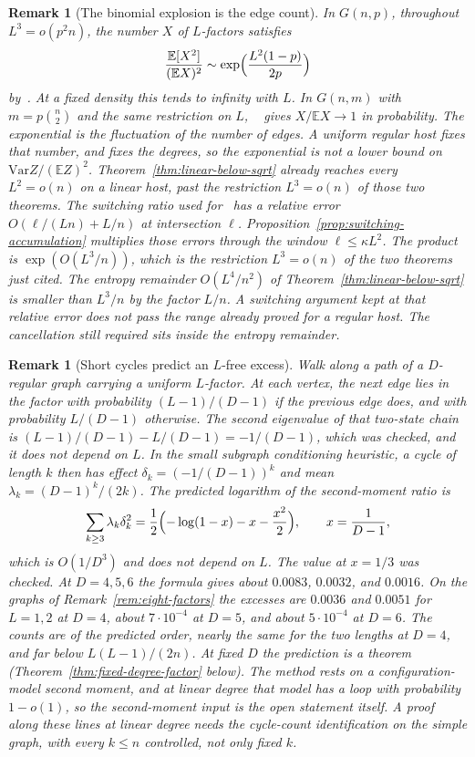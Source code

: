 \documentclass[11pt]{article}
\newtheorem{remark}[theorem]{Remark}
\newcommand{\EE}{\mathbb{E}}
\newcommand{\Var}{\mathrm{Var}}
\begin{document}
\begin{remark}[The binomial explosion is the edge count]
\label{rem:binomial-edge}
In \(G(n,p)\), throughout \(L^3=o(p^2 n)\), the number \(X\) of \(L\)-factors
satisfies
\[
\frac{\EE[X^2]}{(\EE X)^2}
\sim
\exp\Bigl(\frac{L^2(1-p)}{2p}\Bigr)
\]
by~\cite[Theorem~2.1]{Gao13}.
At a fixed density this tends to infinity with \(L\).
In \(G(n,m)\) with \(m=p\binom{n}{2}\) and the same restriction on \(L\),
~\cite[Theorem~2.4]{Gao13} gives \(X/\EE X\to 1\) in probability.
The exponential is the fluctuation of the number of edges.
A uniform regular host fixes that number, and fixes the degrees, so the
exponential is not a lower bound on \(\Var Z/(\EE Z)^2\).
Theorem~\ref{thm:linear-below-sqrt} already reaches every \(L^2=o(n)\) on a
linear host, past the restriction \(L^3=o(n)\) of those two theorems.
The switching ratio used for~\cite[Theorem~2.4]{Gao13} has a relative error
\(O(\ell/(Ln)+L/n)\) at intersection \(\ell\).
Proposition~\ref{prop:switching-accumulation} multiplies those errors through
the window \(\ell\le\kappa L^2\). The product is \(\exp(O(L^3/n))\), which is
the restriction \(L^3=o(n)\) of the two theorems just cited.
The entropy remainder \(O(L^4/n^2)\) of Theorem~\ref{thm:linear-below-sqrt} is
smaller than \(L^3/n\) by the factor \(L/n\).
A switching argument kept at that relative error does not pass the range
already proved for a regular host. The cancellation still required sits inside
the entropy remainder.
\end{remark}

\begin{remark}[Short cycles predict an \(L\)-free excess]
\label{rem:cycle-prediction}
Walk along a path of a \(D\)-regular graph carrying a uniform \(L\)-factor.
At each vertex, the next edge lies in the factor with probability
\((L-1)/(D-1)\) if the previous edge does, and with probability \(L/(D-1)\)
otherwise.
The second eigenvalue of that two-state chain is
\((L-1)/(D-1)-L/(D-1)=-1/(D-1)\), which was checked, and it does not depend
on \(L\).
In the small subgraph conditioning heuristic, a cycle of length \(k\) then
has effect \(\delta_k=(-1/(D-1))^k\) and mean \(\lambda_k=(D-1)^k/(2k)\).
The predicted logarithm of the second-moment ratio is
\[
\sum_{k\ge 3}\lambda_k\delta_k^2
=
\frac12\Bigl(-\log(1-x)-x-\frac{x^2}{2}\Bigr),
\qquad
x=\frac1{D-1},
\]
which is \(O(1/D^3)\) and does not depend on \(L\).
The value at \(x=1/3\) was checked.
At \(D=4,5,6\) the formula gives about \(0.0083\), \(0.0032\), and
\(0.0016\). On the graphs of Remark~\ref{rem:eight-factors} the excesses are
\(0.0036\) and \(0.0051\) for \(L=1,2\) at \(D=4\), about \(7\cdot 10^{-4}\) at
\(D=5\), and about \(5\cdot 10^{-4}\) at \(D=6\).
The counts are of the predicted order, nearly the same for the two lengths
at \(D=4\), and far below \(L(L-1)/(2n)\).
At fixed \(D\) the prediction is a theorem
(Theorem~\ref{thm:fixed-degree-factor} below).
The method rests on a configuration-model second moment, and at linear degree
that model has a loop with probability \(1-o(1)\), so the second-moment input
is the open statement itself.
A proof along these lines at linear degree needs the cycle-count
identification on the simple graph, with every \(k\le n\) controlled, not only
fixed \(k\).
\end{remark}
\end{document}
